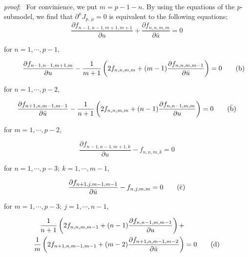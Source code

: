 \documentclass[makeidx,12pt,openany]{report}
\begin{document}
\textit{proof}: \ 
For convinience, we put $m=p-1-n$. By using the equations of the $p$-submodel, 
we find that $\partial^{\mu}J_{p,\, \mu}=0$ is equivalent to 
the following equations;
\begin{equation}
 \frac{\partial f_{n-1,n-1,m+1,m+1}}{\partial u}+
 \frac{\partial f_{n,n,m,m}}{\partial {\bar u}}=0 \tag{a}
\end{equation}
\begin{flushright}
 for \quad $n=1,\cdots,p-1,$ \hspace*{1cm}
\end{flushright}
\begin{equation}
 \hspace*{7mm}
 \frac{\partial f_{n-1,n-1,m+1,m}}{\partial u}-
 \frac{1}{m+1}\left( 2f_{n,n,m,m}+(m-1)
  \frac{\partial f_{n,n,m,m-1}}{\partial {\bar u}} \right) =0 \tag{b}
\end{equation}
\begin{flushright}
 for \quad $n=1,\cdots,p-2,$ \hspace*{1cm}
\end{flushright}
\begin{equation}
 \frac{\partial f_{n+1,n,m-1,m-1}}{\partial \bar{u}}-
 \frac{1}{n+1}\left( 2f_{n,n,m,m}+(n-1)
  \frac{\partial f_{n,n-1,m,m}}{\partial u} \right) =0 \tag{$\bar{\mbox{b}}$}
\end{equation}
\begin{flushright}
 for \quad $m=1,\cdots,p-2,$ \hspace*{1cm}
\end{flushright}
\begin{equation}
 \frac{\partial f_{n-1,n-1,m+1,k}}{\partial u}-f_{n,n,m,k}=0 \tag{c}
\end{equation}
\begin{flushright}
 for \quad $n=1,\cdots,p-3; \ k=1,\cdots,m-1,$ \hspace*{1cm}
\end{flushright}
\begin{equation}
 \frac{\partial f_{n+1,j,m-1,m-1}}{\partial \bar{u}}-f_{n,j,m,m}=0
 \tag{$\bar{\mbox{c}}$}
\end{equation}
\begin{flushright}
 for \quad $m=1,\cdots,p-3; \ j=1,\cdots,n-1,$ \hspace*{1cm}
\end{flushright}
\begin{gather}
  \hspace*{-15mm} 
  \frac{1}{n+1}\left( 2f_{n,n,m,m-1}+(n-1)
  \frac{\partial f_{n,n-1,m,m-1}}{\partial u} \right) + \notag\\
 \frac{1}{m}\left( 2f_{n+1,n,m-1,m-1}+(m-2)
  \frac{\partial f_{n+1,n,m-1,m-2}}{\partial \bar{u}} \right)=0 
   \tag{d}
  \end{gather}
\end{document}
